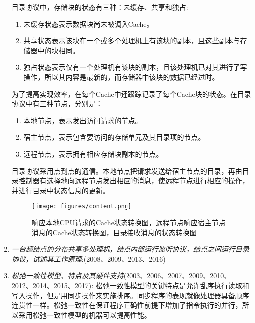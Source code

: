 \documentclass[a4paper]{ctexbook}
\begin{document}
\begin{enumerate}
  目录协议中，存储块的状态有三种：未缓存、共享和独占:
  \begin{enumerate}
    \item 未缓存状态表示数据块尚未被调入Cache。
    \item 共享状态表示该块在一个或多个处理机上有该块的副本，且这些副本与存储器中的块相同。
    \item 独占状态表示仅有一个处理机有该块的副本，且该处理机已对其进行了写操作，所以其内容是最新的，而存储器中该块的数据已经过时。
  \end{enumerate}
  为了提高实现效率，在每个Cache中还跟踪记录了每个Cache块的状态。在目录协议中有三种节点，分别是：
  \begin{enumerate}
    \item 本地节点，表示发出访问请求的节点。
    \item 宿主节点，表示包含要访问的存储单元及其目录项的节点。
    \item 远程节点，表示拥有相应存储块副本的节点。
  \end{enumerate}
  
  目录协议采用点到点的通信。本地节点把请求发送给宿主节点的目录，再由目录控制器有选择地向远程节点发出相应的消息，使远程节点进行相应的操作，并进行目录中状态信息的更新。
    
  \begin{figure}[H]
    \centering
    \caption{响应本地CPU请求的Cache状态转换图，远程节点响应宿主节点消息的Cache状态转换图，目录接收消息的状态转换图}
    \texttt{[image: figures/content.png]}
  \end{figure}
  
  \item \emph{一台超结点的分布共享多处理机，结点内部运行监听协议，结点之间运行目录协议，试述其工作原理}:(2008、2009、2013、2016)
  
  \item \emph{松弛一致性模型、特点及其硬件支持}(2003、2006、2007、2009、2010、2012、2014、2015、2017):
  松弛一致性模型的关键特点是允许乱序执行读取和写入操作，但是用同步操作来实施排序。同步程序的表现就像处理器具备顺序连贯性一样。松弛一致性在保证程序正确性前提下增加了指令执行的并行，所以采用松弛一致性模型的机器可以提高性能。
  

\end{enumerate}
\end{document}
